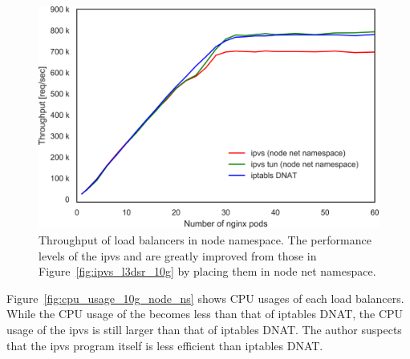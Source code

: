 \begin{figure}[h]
  \centering
  \includegraphics[width=0.8\columnwidth]{Figs/ipvs_l3dsr_10g_node_ns}
  \par\bigskip
  \centering
  \begin{minipage}{0.9\columnwidth}
    \caption[Throughput of load balancers in node namespace]{
      Throughput of load balancers in node namespace.
      The performance levels of the ipvs and  are greatly improved from those in Figure~\ref{fig:ipvs_l3dsr_10g} by placing them in node net namespace.
    }
    \label{fig:ipvs_l3dsr_10g_node_ns}
  \end{minipage}
\end{figure}

Figure~\ref{fig:cpu_usage_10g_node_ns} shows CPU usages of each load balancers.
While the CPU usage of the  becomes less than that of iptables DNAT, the CPU usage of the ipvs is still larger than that of iptables DNAT.
The author suspects that the ipvs program itself is less efficient than iptables DNAT.

